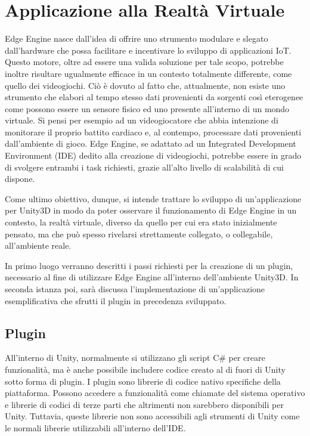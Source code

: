 \section{Applicazione alla Realtà Virtuale}
Edge Engine nasce dall'idea di offrire uno strumento modulare e slegato dall'hardware che possa facilitare e incentivare lo sviluppo di applicazioni IoT. Questo motore, oltre ad essere una valida soluzione per tale scopo, potrebbe inoltre risultare ugualmente efficace in un contesto totalmente differente, come quello dei videogiochi. Ciò è dovuto al fatto che, attualmente, non esiste uno strumento che elabori al tempo stesso dati provenienti da sorgenti così eterogenee come possono essere un sensore fisico ed uno presente all'interno di un mondo virtuale. Si pensi per esempio ad un videogiocatore che abbia intenzione di monitorare il proprio battito cardiaco e, al contempo, processare dati provenienti dall'ambiente di gioco. Edge Engine, se adattato ad un Integrated Development Environment (IDE) dedito alla creazione di videogiochi, potrebbe essere in grado di svolgere entrambi i task richiesti, grazie all'alto livello di scalabilità di cui dispone.

Come ultimo obiettivo, dunque, si intende trattare lo sviluppo di un'applicazione per Unity3D in modo da poter osservare il funzionamento di Edge Engine in un contesto, la realtà virtuale, diverso da quello per cui era stato inizialmente pensato, ma che può spesso rivelarsi strettamente collegato, o collegabile, all'ambiente reale.

In primo luogo verranno descritti i passi richiesti per la creazione di un plugin, necessario al fine di utilizzare Edge Engine all'interno dell'ambiente Unity3D. In seconda istanza poi, sarà discussa l'implementazione di un'applicazione esemplificativa che sfrutti il plugin in precedenza sviluppato.
\subsection{Plugin}\label{plugin}
All'interno di Unity, normalmente si utilizzano gli script C\# per creare funzionalità, ma è anche possibile includere codice creato al di fuori di Unity sotto forma di plugin. I plugin sono librerie di codice nativo specifiche della piattaforma. Possono accedere a funzionalità come chiamate del sistema operativo e librerie di codici di terze parti che altrimenti non sarebbero disponibili per Unity. Tuttavia, queste librerie non sono accessibili agli strumenti di Unity come le normali librerie utilizzabili all'interno dell'IDE.

